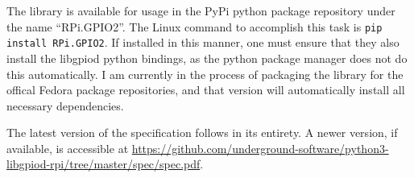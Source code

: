 \documentclass{article}
\begin{document}
The library is available for usage
in the PyPi python package repository
under the name ``RPi.GPIO2''.
The Linux command to accomplish this task
is \texttt{pip install RPi.GPIO2}.
If installed in this manner,
one must ensure that they also
install the libgpiod python bindings,
as the python package manager
does not do this automatically.
I am currently in the process
of packaging the library for
the offical Fedora package repositories,
and that version will automatically
install all necessary dependencies.

The latest version of the specification follows in its entirety.
A newer version, if available, is accessible at
\url{https://github.com/underground-software/python3-libgpiod-rpi/tree/master/spec/spec.pdf}.






\end{document}
